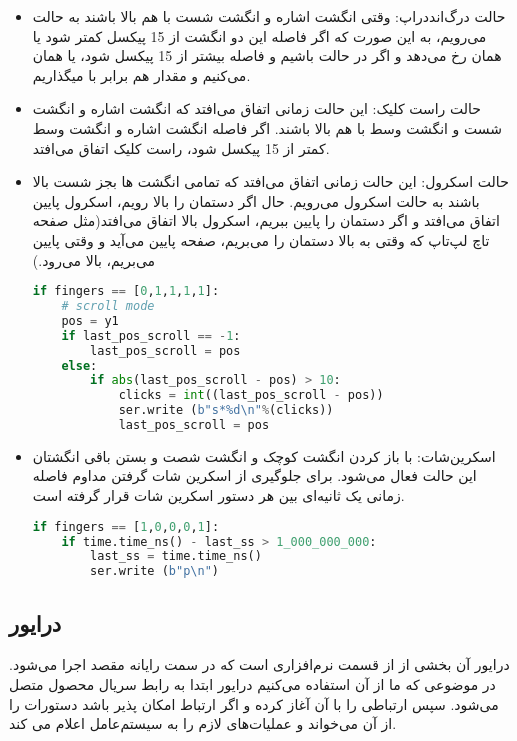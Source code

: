 \documentclass{article}
\begin{document}
\begin{itemize}
	
	\item حالت درگ‌اند‌دراپ:
	وقتی انگشت اشاره و انگشت شست با هم بالا باشند به حالت  می‌رویم، به این صورت که اگر فاصله این دو انگشت از 15 پیکسل کمتر شود  یا همان  رخ می‌دهد و اگر در حالت  باشیم و فاصله بیشتر از 15 پیکسل شود،  یا همان  می‌کنیم و مقدار  هم برابر با  میگذاریم.
	
	\item حالت راست کلیک:
	این حالت زمانی اتفاق می‌افتد که انگشت اشاره و انگشت شست و انگشت وسط با هم بالا باشند. اگر فاصله انگشت اشاره و انگشت وسط کمتر از 15 پیکسل شود، راست کلیک اتفاق می‌افتد.
	
	\item حالت اسکرول:
	این حالت زمانی اتفاق می‌افتد که تمامی انگشت ها بجز شست بالا باشند به حالت اسکرول می‌رویم. حال اگر دستمان را بالا رویم، اسکرول پایین اتفاق می‌افتد و اگر دستمان را پایین ببریم، اسکرول بالا اتفاق می‌افتد(مثل صفحه تاچ لپ‌تاپ که وقتی به بالا دستمان را می‌بریم، صفحه پایین می‌آید و وقتی پایین می‌بریم، بالا می‌رود.)
	
\begin{latin}
\begin{lstlisting}[language=python]
if fingers == [0,1,1,1,1]:
    # scroll mode
    pos = y1
    if last_pos_scroll == -1:
        last_pos_scroll = pos
    else:
        if abs(last_pos_scroll - pos) > 10:
            clicks = int((last_pos_scroll - pos))
            ser.write (b"s*%d\n"%(clicks))
            last_pos_scroll = pos
\end{lstlisting}	
\end{latin}
	
	
	\item اسکرین‌شات:
	با باز کردن انگشت کوچک و انگشت شصت و بستن باقی انگشتان این حالت فعال می‌شود. برای جلوگیری از اسکرین شات گرفتن مداوم فاصله زمانی یک ثانیه‌ای بین هر دستور اسکرین شات قرار گرفته است.
	
\begin{latin}
\begin{lstlisting}[language=python]
if fingers == [1,0,0,0,1]:
    if time.time_ns() - last_ss > 1_000_000_000:
        last_ss = time.time_ns()
        ser.write (b"p\n")
\end{lstlisting}	
\end{latin}
	
\end{itemize}

\subsection{درایور}
درایور آن بخشی از از قسمت نرم‌افزاری است که در سمت رایانه مقصد اجرا می‌شود. در موضوعی که ما از آن استفاده می‌کنیم درایور ابتدا به رابط سریال محصول متصل می‌شود. سپس ارتباطی را با آن آغاز کرده و اگر ارتباط امکان پذیر باشد دستورات را از آن می‌خواند و عملیات‌های لازم را به سیستم‌عامل اعلام می‌ کند. 
\end{document}
